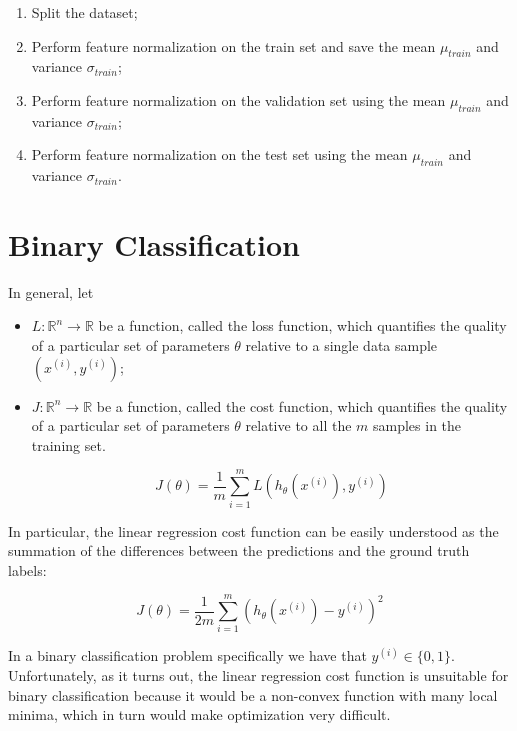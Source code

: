 \begin{enumerate}
    \item Split the dataset;
    \item Perform feature normalization on the train set and save the mean $\mu_{train}$ and variance $\sigma_{train}$;
    \item Perform feature normalization on the validation set using the mean $\mu_{train}$ and variance $\sigma_{train}$;
    \item Perform feature normalization on the test set using the mean $\mu_{train}$ and variance $\sigma_{train}$.
\end{enumerate}


\section{Binary Classification}

In general, let

\begin{itemize}
    \item $L \colon \mathbb{R}^n \to \mathbb{R}$ be a function, called the loss function, which quantifies the quality of a particular set of parameters $\theta$ relative to a single data sample $(x^{(i)}, y^{(i)})$;
    \item $J \colon \mathbb{R}^n \to \mathbb{R}$ be a function, called the cost function, which quantifies the quality of a particular set of parameters $\theta$ relative to all the $m$ samples in the training set.

    \begin{equation}
    J(\theta) = \frac{1}{m} \sum_{i=1}^{m} L(h_{\theta}(x^{(i)}), y^{(i)})
    \end{equation}
\end{itemize}

In particular, the linear regression cost function can be easily understood as the summation of the differences between the predictions and the ground truth labels:

\begin{equation}
J(\theta) = \frac{1}{2m} \sum_{i=1}^{m} (h_{\theta}(x^{(i)}) - y^{(i)})^2
\end{equation}

In a binary classification problem specifically we have that $y^{(i)} \in \{0, 1\}$. Unfortunately, as it turns out, the linear regression cost function is unsuitable for binary classification because it would be a non-convex function with many local minima, which in turn would make optimization very difficult.

